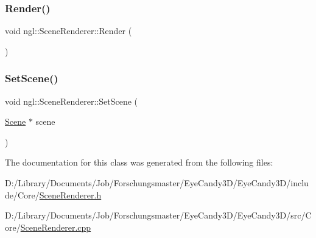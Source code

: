 \mbox{\label{classngl_1_1_scene_renderer_ae6760a1098aafbd318a4c57eb41062dc}} 
\subsubsection{\texorpdfstring{Render()}{Render()}}
{\footnotesize\ttfamily void ngl\+::\+Scene\+Renderer\+::\+Render (\begin{DoxyParamCaption}{ }\end{DoxyParamCaption})}

\mbox{\label{classngl_1_1_scene_renderer_a83e70c0cff7552de9142f4905f442855}} 
\subsubsection{\texorpdfstring{Set\+Scene()}{SetScene()}}
{\footnotesize\ttfamily void ngl\+::\+Scene\+Renderer\+::\+Set\+Scene (\begin{DoxyParamCaption}\item[{\mbox{\hyperlink{classngl_1_1_scene}{Scene}} $\ast$}]{scene }\end{DoxyParamCaption})}



The documentation for this class was generated from the following files\+:\begin{DoxyCompactItemize}
\item 
D\+:/\+Library/\+Documents/\+Job/\+Forschungsmaster/\+Eye\+Candy3\+D/\+Eye\+Candy3\+D/include/\+Core/\mbox{\hyperlink{_scene_renderer_8h}{Scene\+Renderer.\+h}}\item 
D\+:/\+Library/\+Documents/\+Job/\+Forschungsmaster/\+Eye\+Candy3\+D/\+Eye\+Candy3\+D/src/\+Core/\mbox{\hyperlink{_scene_renderer_8cpp}{Scene\+Renderer.\+cpp}}\end{DoxyCompactItemize}
